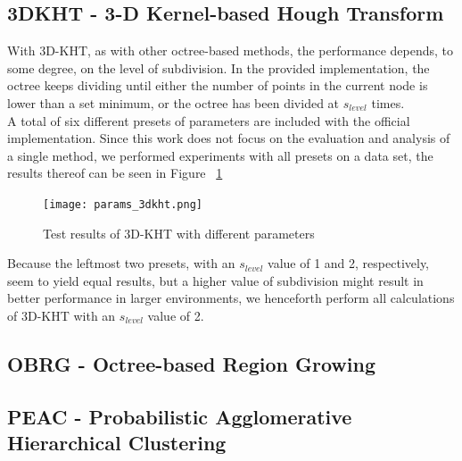 \documentclass[main.tex]{subfiles}
\begin{document}
\subsection*{3DKHT - 3-D Kernel-based Hough Transform}
With 3D-KHT, as with other octree-based methods, the performance depends, to some degree, on the level of subdivision.
In the provided implementation, the octree keeps dividing until either the number of points in the current node is lower than a set minimum, or the
octree has been divided at $s_{level}$ times.\\
A total of six different presets of parameters are included with the official implementation.
Since this work does not focus on the evaluation and analysis of a single method, we performed experiments with all presets on a data set, the
results thereof can be seen in Figure ~\ref{fig:3dkht_params}
\begin{figure}[!h]
    \centering
    \texttt{[image: params\_3dkht.png]}
    \caption{Test results of 3D-KHT with different parameters}
    \label{fig:3dkht_params}
\end{figure}

Because the leftmost two presets, with an $s_{level}$ value of 1 and 2, respectively, seem to yield equal results, but a higher value of subdivision
might result in better performance in larger environments, we henceforth perform all calculations of 3D-KHT with an $s_{level}$ value of 2.

\subsection*{OBRG - Octree-based Region Growing}
\subsection*{PEAC - Probabilistic Agglomerative Hierarchical Clustering}
\end{document}
